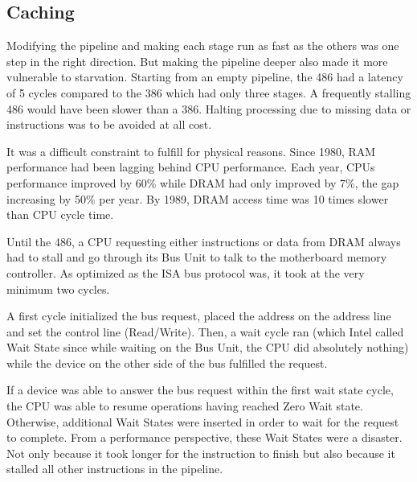 \subsection{Caching }
Modifying the pipeline and making each stage run as fast as the others was one step in the right direction. But making the pipeline deeper also made it more vulnerable to starvation. Starting from an empty pipeline, the 486 had a latency of 5 cycles compared to the 386 which had only three stages. A frequently stalling 486 would have been slower than a 386. Halting processing due to missing data or instructions was to be avoided at all cost.\\
\par
It was a difficult constraint to fulfill for physical reasons. Since 1980, RAM performance had been lagging behind CPU performance. Each year, CPUs performance improved by 60\% while DRAM had only improved by 7\%, the gap increasing by 50\% per year. By 1989, DRAM access time was 10 times slower than CPU cycle time.\\
\par
\vspace{2mm}
\par
Until the 486, a CPU requesting either instructions or data from DRAM always had to stall and go through its Bus Unit to talk to the motherboard memory controller. As optimized as the ISA bus protocol was, it took at the very minimum two cycles.\\
\par 
A first cycle initialized the bus request, placed the address on the address line and set the control line (Read/Write). Then, a wait cycle ran (which Intel called Wait State since while waiting on the Bus Unit, the CPU did absolutely nothing) while the device on the other side of the bus fulfilled the request.\\
\par
{}
\par
If a device was able to answer the bus request within the first wait state cycle, the CPU was able to resume operations having reached Zero Wait state. Otherwise, additional Wait States were inserted in order to wait for the request to complete. From a performance perspective, these Wait States were a disaster. Not only because it took longer for the instruction to finish but also because it stalled all other instructions in the pipeline.\\
